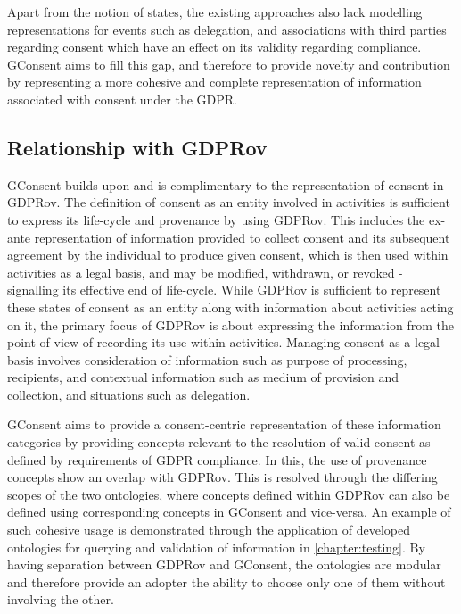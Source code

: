Apart from the notion of states, the existing approaches also lack modelling representations for events such as delegation, and associations with third parties regarding consent which have an effect on its validity regarding compliance.
GConsent aims to fill this gap, and therefore to provide novelty and contribution by representing a more cohesive and complete representation of information associated with consent under the GDPR.

\subsection{Relationship with GDPRov}
GConsent builds upon and is complimentary to the representation of consent in GDPRov.
The definition of consent as an entity involved in activities is sufficient to express its life-cycle and provenance by using GDPRov. This includes the ex-ante representation of information provided to collect consent and its subsequent agreement by the individual to produce given consent, which is then used within activities as a legal basis, and may be modified, withdrawn, or revoked - signalling its effective end of life-cycle.
While GDPRov is sufficient to represent these states of consent as an entity along with information about activities acting on it, the primary focus of GDPRov is about expressing the information from the point of view of recording its use within activities.
Managing consent as a legal basis involves consideration of information such as purpose of processing, recipients, and contextual information such as medium of provision and collection, and situations such as delegation.

GConsent aims to provide a consent-centric representation of these information categories by providing concepts relevant to the resolution of valid consent as defined by requirements of GDPR compliance. In this, the use of provenance concepts show an overlap with GDPRov.
This is resolved through the differing scopes of the two ontologies, where concepts defined within GDPRov can also be defined using corresponding concepts in GConsent and vice-versa. An example of such cohesive usage is demonstrated through the application of developed ontologies for querying and validation of information in \autoref{chapter:testing}.
By having separation between GDPRov and GConsent, the ontologies are modular and therefore provide an adopter the ability to choose only one of them without involving the other.


